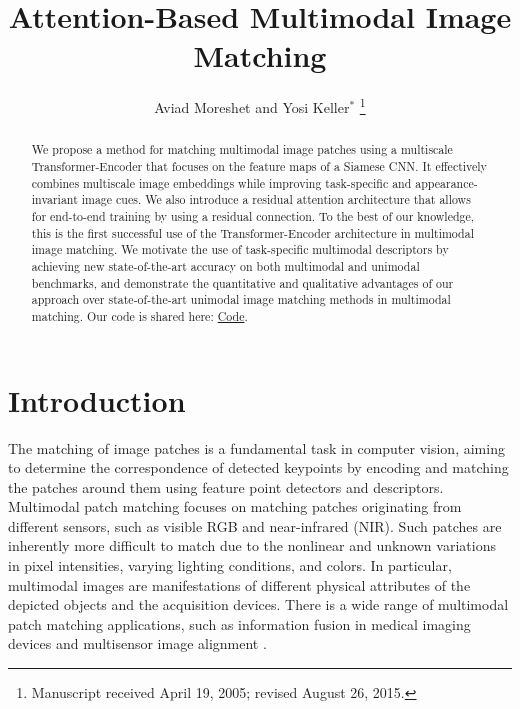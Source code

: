 \documentclass[10pt,journal]{IEEEtran}\usepackage{amsfonts}
\begin{document}
\thispagestyle{empty}



\title{Attention-Based Multimodal Image Matching}

\author{Aviad Moreshet and Yosi Keller$^{\ast}$
\thanks{Manuscript received April 19, 2005; revised August 26, 2015.}}

\maketitle

\begin{abstract}
We propose a method for matching multimodal image patches using a multiscale Transformer-Encoder
that focuses on the feature maps of a Siamese CNN. It effectively combines multiscale image embeddings while improving task-specific and appearance-invariant image cues. We also introduce a residual attention architecture that allows for end-to-end training by using a residual connection. To the best of our knowledge, this is the first successful use of the Transformer-Encoder architecture in multimodal image matching. We motivate the use of task-specific multimodal descriptors by achieving new state-of-the-art accuracy on both multimodal and unimodal benchmarks, and demonstrate the quantitative and qualitative advantages of our approach over state-of-the-art unimodal image matching methods in
multimodal matching. Our code is shared here: \href{https://github.com/CodeJjang/multiscale-attention-patch-matching}{Code}.
\end{abstract}










\section{Introduction}

The matching of image patches is a fundamental task in computer vision,
aiming to determine the correspondence of detected keypoints by encoding and
matching the patches around them using feature point detectors and
descriptors. Multimodal patch matching focuses on matching patches
originating from different sensors, such as visible RGB and near-infrared
(NIR). Such patches are inherently more difficult to match due to the
nonlinear and unknown variations in pixel intensities, varying lighting
conditions, and colors. In particular, multimodal images are manifestations
of different physical attributes of the depicted objects and the acquisition
devices. There is a wide range of multimodal patch matching applications,
such as information fusion in medical imaging devices \cite {MedicalImageRegistration} and multisensor image alignment \cite {MultiSensorAlignment}.
\end{document}
